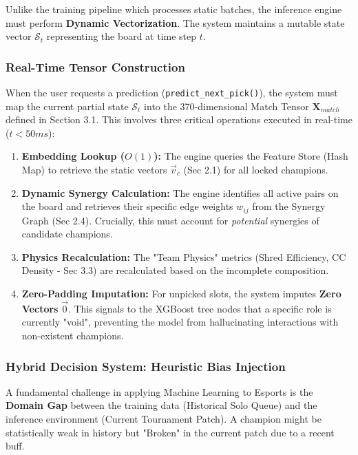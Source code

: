 \documentclass[12pt, a4paper]{article}
\begin{document}
    Unlike the training pipeline which processes static batches, the inference engine must perform \textbf{Dynamic Vectorization}. The system maintains a mutable state vector $\mathcal{S}_t$ representing the board at time step $t$.

    \subsubsection{Real-Time Tensor Construction}
    When the user requests a prediction (\texttt{predict\_next\_pick()}), the system must map the current partial state $\mathcal{S}_t$ into the 370-dimensional Match Tensor $\mathbf{X}_{match}$ defined in Section 3.1. This involves three critical operations executed in real-time ($t < 50ms$):

    \begin{enumerate}
        \item \textbf{Embedding Lookup ($O(1)$):} The engine queries the Feature Store (Hash Map) to retrieve the static vectors $\vec{v}_c$ (Sec 2.1) for all locked champions.
        \item \textbf{Dynamic Synergy Calculation:} The engine identifies all active pairs on the board and retrieves their specific edge weights $w_{ij}$ from the Synergy Graph (Sec 2.4). Crucially, this must account for \textit{potential} synergies of candidate champions.
        \item \textbf{Physics Recalculation:} The "Team Physics" metrics (Shred Efficiency, CC Density - Sec 3.3) are recalculated based on the incomplete composition.
        \item \textbf{Zero-Padding Imputation:} For unpicked slots, the system imputes \textbf{Zero Vectors} $\vec{0}$. This signals to the XGBoost tree nodes that a specific role is currently "void", preventing the model from hallucinating interactions with non-existent champions.
    \end{enumerate}

    \subsubsection{Hybrid Decision System: Heuristic Bias Injection}
    A fundamental challenge in applying Machine Learning to Esports is the \textbf{Domain Gap} between the training data (Historical Solo Queue) and the inference environment (Current Tournament Patch). A champion might be statistically weak in history but "Broken" in the current patch due to a recent buff.
\end{document}

